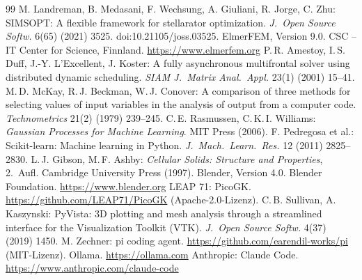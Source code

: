 \documentclass[10pt,a4paper]{article}
\begin{document}
\begin{thebibliography}{99}\small
{} M. Landreman, B. Medasani, F. Wechsung, A. Giuliani, R. Jorge, C. Zhu: SIMSOPT: A flexible
  framework for stellarator optimization. \emph{J.\ Open Source Softw.} 6(65) (2021) 3525.
  doi:10.21105/joss.03525.
 ElmerFEM, Version 9.0. CSC -- IT Center for Science, Finnland. \url{https://www.elmerfem.org}
 P.\,R. Amestoy, I.\,S. Duff, J.-Y. L'Excellent, J. Koster: A fully asynchronous multifrontal
  solver using distributed dynamic scheduling. \emph{SIAM J.\ Matrix Anal.\ Appl.} 23(1) (2001) 15--41.
 M.\,D. McKay, R.\,J. Beckman, W.\,J. Conover: A comparison of three methods for selecting
  values of input variables in the analysis of output from a computer code. \emph{Technometrics} 21(2) (1979)
  239--245.
 C.\,E. Rasmussen, C.\,K.\,I. Williams: \emph{Gaussian Processes for Machine Learning}.
  MIT Press (2006).
 F. Pedregosa et al.: Scikit-learn: Machine learning in Python. \emph{J.\ Mach.\ Learn.\ Res.}
  12 (2011) 2825--2830.
 L.\,J. Gibson, M.\,F. Ashby: \emph{Cellular Solids: Structure and Properties}, 2.\ Aufl.
  Cambridge University Press (1997).
 Blender, Version 4.0. Blender Foundation. \url{https://www.blender.org}
 LEAP 71: PicoGK. \url{https://github.com/LEAP71/PicoGK} (Apache-2.0-Lizenz).
 C.\,B. Sullivan, A. Kaszynski: PyVista: 3D plotting and mesh analysis through a streamlined
  interface for the Visualization Toolkit (VTK). \emph{J.\ Open Source Softw.} 4(37) (2019) 1450.
 M. Zechner: pi coding agent. \url{https://github.com/earendil-works/pi} (MIT-Lizenz).
 Ollama. \url{https://ollama.com}
 Anthropic: Claude Code. \url{https://www.anthropic.com/claude-code}
\end{thebibliography}
\end{document}
